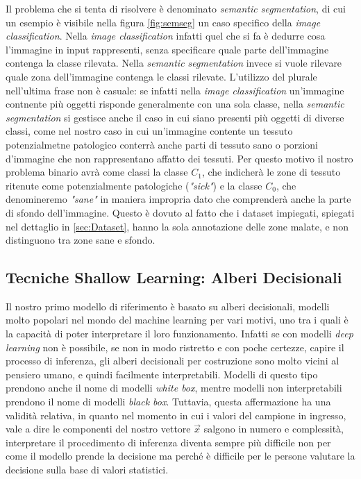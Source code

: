 Il problema che si tenta di risolvere è denominato
{\it semantic segmentation}, di cui un esempio è visibile nella figura 
\ref{fig:semseg} un caso specifico della {\it image classification}.
Nella {\it image classification} infatti quel che si fa è dedurre cosa l'immagine
in input rappresenti, senza specificare quale parte dell'immagine contenga la classe
rilevata.
Nella {\it semantic segmentation} invece si vuole rilevare quale zona dell'immagine
contenga le classi rilevate. 
L'utilizzo del plurale nell'ultima frase non è casuale: se infatti nella {\it image classification}
un'immagine contnente più oggetti risponde generalmente con una sola classe,
nella {\it semantic segmentation} si gestisce anche il caso in cui siano presenti più
oggetti di diverse classi, come nel nostro caso in cui un'immagine contente un
tessuto potenzialmetne patologico conterrà anche parti di tessuto sano o
porzioni d'immagine che non rappresentano affatto dei tessuti.
Per questo motivo il nostro problema binario avrà come classi la classe $C_1$, che indicherà
le zone di tessuto ritenute come potenzialmente patologiche ({\it "sick"}) e la classe $C_0$,
che denomineremo {\it "sane"} in maniera impropria dato che comprenderà
anche la parte di sfondo dell'immagine.
Questo è dovuto al fatto che i dataset impiegati, spiegati nel dettaglio in 
\ref{sec:Dataset}, hanno la sola annotazione delle zone malate, e non distinguono tra
zone sane e sfondo.


\subsection{\label{sec:shallow-learning}Tecniche Shallow Learning: Alberi Decisionali}

Il nostro primo modello di riferimento\cite{Toma2022} è basato su
alberi decisionali, modelli molto popolari nel mondo del machine learning
per vari motivi, uno tra i quali è la capacità di poter interpretare il loro funzionamento.
Infatti se con modelli {\it deep learning} non è possibile, se non in
modo ristretto e con poche certezze, capire il processo di inferenza, 
gli alberi decisionali per costruzione sono molto
vicini al pensiero umano, e quindi facilmente interpretabili.
Modelli di questo tipo prendono anche il nome di modelli {\it white box},
mentre modelli non interpretabili prendono il nome di modelli {\it black box}.
Tuttavia, questa affermazione ha una validità relativa, in quanto
nel momento in cui i valori del campione in ingresso, vale a dire le
componenti del nostro vettore $\vec{x}$ salgono in numero e complessità,
interpretare il procedimento di inferenza diventa sempre più difficile non per
come il modello prende la decisione ma perché è difficile per le persone
valutare la decisione sulla base di valori statistici.

